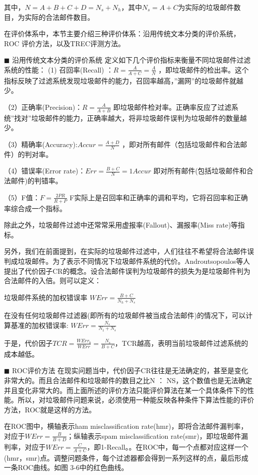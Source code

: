 其中，$N=A+B+C+D=N_s+N_h$，其中$N_s=A+C$为实际的垃圾邮件数目，为实际的合法邮件数目。

在评价体系中，本节主要介绍三种评价体系：沿用传统文本分类的评价系统，	ROC 评价方法，以及TREC评测方法。

$\blacksquare$ 沿用传统文本分类的评价系统
定义如下几个评价指标来衡量不同垃圾邮件过滤系统的性能：
(1) 召回率(Recall) ：$R=\frac{A}{A+C}=\frac{A}{N}$ ，即垃圾邮件的检出率。这个指标反映了过滤系统发现垃圾邮件的能力，召回率越高，”漏网”的垃圾邮件就越少。

（2）正确率(Precision)：$R=\frac{A}{A+B}$ 即垃圾邮件检对率。正确率反应了过滤系统”找对”垃圾邮件的能力，正确率越大，将非垃圾邮件误判为垃圾邮件的数量越少。

（3）精确率(Accuracy):$Accur=\frac{A+D}{N}$ ，即对所有邮件（包括垃圾邮件和合法邮件）的判对率。

（4）错误率(Error rate)：$Err=\frac{B+C}{N}=1 Accur$ 即对所有邮件(包括垃圾邮件和合法邮件)的判错率。

（5）F值：$F=\frac{2PR}{R+P}$ F实际上是召回率和正确率的调和平均，它将召回率和正确率综合成一个指标。

除此之外，垃圾邮件过滤中还常常采用虚报率(Fallout)、漏报率(Miss rate)等指标。

另外，我们在前面提到，在实际的垃圾邮件过滤中，人们往往不希望将合法邮件误判成垃圾邮件。为了表示不同情况下垃圾邮件系统的代价。Androutsopoulos等人提出了代价因子CR的概念。设合法邮件误判为垃圾邮件的损失为是垃圾邮件判为合法邮件的入倍。则可以定义：

垃圾邮件系统的加权错误率 $WErr=\frac{B+C}{N_h+N_s}$

在没有任何垃圾邮件过滤器(即所有的垃圾邮件被当成合法邮件)的情况下，可以计算基准的加权错误率: $WErr=\frac{N_s}{N_1+N_s}$

于是，代价因子$TCR=\frac{WErr_b}{WErr}=\frac{N_s}{B+C}$，TCR越高，表明当前垃圾邮件过滤系统的成本越低。

$\blacksquare$ ROC评价方法
在现实问题当中，代价因子CR往往是无法确定的，甚至是变化非常大的。而且合法邮件和垃圾邮件的数目之比N ： NS，这个数值也是无法确定并且变化非常大的。而上面所述的评价方法只能评价算法在某一个具体条件下的性能。所以，对垃圾邮件问题来说，必须使用一种能反映各种条件下算法性能的评价方法，ROC就是这样的方法。

在ROC图中，横轴表示ham misclassification rate(hmr)，即将合法邮件漏判率，对应于$WErr=\frac{B}{B+D}$；纵轴表示spam misclassification rate(smr)，即垃圾邮件漏判率，对应于$WErr=\frac{C}{A+C}$，即1-Recall。。在ROC中，每一个点都对应这样一个(hmr，smr)点。调整问题条件，每个过滤器都会得到一系列这样的点，最后形成一条ROC曲线。如图 3-6中的红色曲线。

